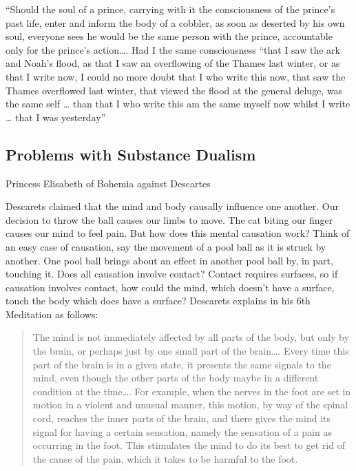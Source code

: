 \documentclass[]{article}
\begin{document}
``Should the soul of a prince, carrying with it the consciousness of the
prince's past life, enter and inform the body of a cobbler, as soon as
deserted by his own soul, everyone sees he would be the same person with
the prince, accountable only for the prince's action\ldots{}. Had I the
same consciousness ``that I saw the ark and Noah's flood, as that I saw
an overflowing of the Thames last winter, or as that I write now, I
could no more doubt that I who write this now, that saw the Thames
overflowed last winter, that viewed the flood at the general deluge, was
the same self \ldots{} than that I who write this am the same myself now
whilst I write \ldots{} that I was yesterday''

\subsection{Problems with Substance
Dualism}\label{problems-with-substance-dualism}

Princess Elisabeth of Bohemia against Descartes

Descarets claimed that the mind and body causally influence one another.
Our decision to throw the ball causes our limbs to move. The cat biting
our finger causes our mind to feel pain. But how does this mental
causation work? Think of an easy case of causation, say the movement of
a pool ball as it is struck by another. One pool ball brings about an
effect in another pool ball by, in part, touching it. Does all causation
involve contact? Contact requires surfaces, so if causation involves
contact, how could the mind, which doesn't have a surface, touch the
body which does have a surface? Descarets explains in his 6th Meditation
as follows:

\begin{quote}
The mind is not immediately affected by all parts of the body, but only
by the brain, or perhaps just by one small part of the brain\ldots{}.
Every time this part of the brain is in a given state, it presents the
same signals to the mind, even though the other parts of the body maybe
in a different condition at the time\ldots{}. For example, when the
nerves in the foot are set in motion in a violent and unusual manner,
this motion, by way of the spinal cord, reaches the inner parts of the
brain, and there gives the mind its signal for having a certain
sensation, namely the sensation of a pain as occurring in the foot. This
stimulates the mind to do its best to get rid of the cause of the pain,
which it takes to be harmful to the foot.
\end{quote}
\end{document}
